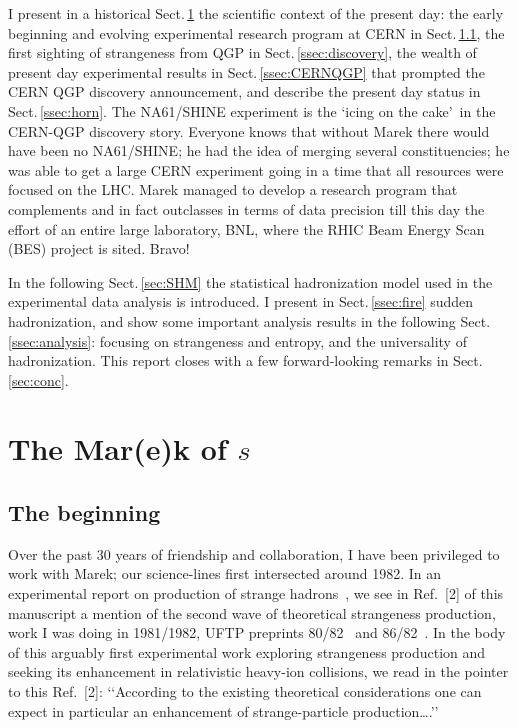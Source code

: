 \documentclass{appolb}
\begin{document}
I present in a historical Sect.\,\ref{Dedic} the scientific context of the present day: the early beginning and evolving experimental research program at CERN in Sect.\,\ref{ref:dst}, the first sighting of strangeness from QGP in Sect.\,\ref{ssec:discovery}, the wealth of present day experimental results in Sect.\,\ref{ssec:CERNQGP} that prompted the CERN QGP discovery announcement, and describe the  present day status in Sect.\,\ref{ssec:horn}. The NA61/SHINE experiment is the \lq icing on the cake\rq\ in the CERN-QGP discovery story. Everyone knows that without Marek there would have been no NA61/SHINE; he had the idea of merging several constituencies; he was able to get a large CERN experiment going in a time that all resources were focused on the LHC. Marek managed to develop a research program that complements and in fact outclasses in terms of data precision till this day the effort of an entire large laboratory, BNL, where the RHIC Beam Energy Scan (BES) project is sited. Bravo! 

In the following Sect.\,\ref{sec:SHM} the statistical hadronization model used in the experimental data analysis is introduced. I present in Sect.\,\ref{ssec:fire}  sudden hadronization,  and show some important analysis results in the following Sect.\,\ref{ssec:analysis}: focusing on strangeness and entropy, and the universality of hadronization.  This report closes with a few forward-looking remarks in Sect.\,\ref{sec:conc}.
\section{The Mar(e)k of $s$}\label{Dedic}
\subsection{The beginning}\label{ref:dst}
Over the past 30 years of friendship and collaboration, I have been privileged to work with Marek; our science-lines first intersected around 1982. In an experimental report on production of strange hadrons~\cite{Anikina:1984zh}, we see in Ref.~[2] of this manuscript a mention of the second wave of theoretical strangeness production, work I was doing in 1981/1982, UFTP preprints 80/82~\cite{Rafelski:1982ii} and 86/82~\cite{Rafelski:1982bi}. In the body of this arguably first experimental work exploring strangeness production and seeking its enhancement in relativistic heavy-ion collisions, we read in the pointer to this Ref.~[2]: \lq\lq According to the existing theoretical considerations one can expect in particular an enhancement of strange-particle production\ldots\;.\rq\rq\ 
\end{document}
